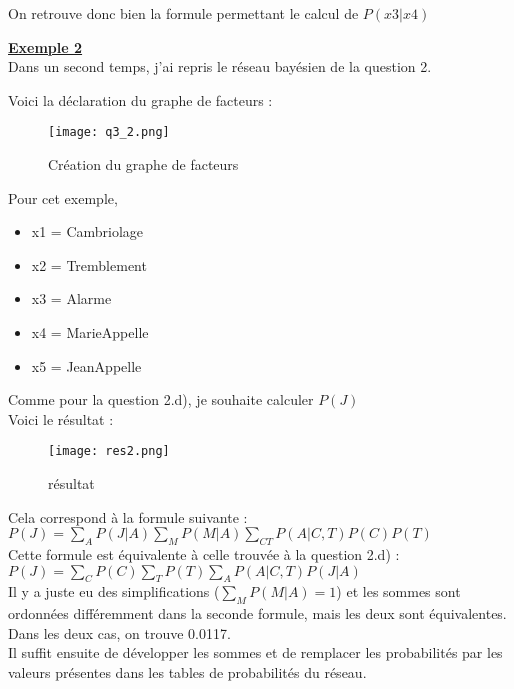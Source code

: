 \documentclass[12pt]{article}
\begin{document}
On retrouve donc bien la formule permettant le calcul de $P(x3|x4)$

\textbf{\underline{Exemple 2}}
\\
Dans un second temps, j'ai repris le réseau bayésien de la question 2.

Voici la déclaration du graphe de facteurs :
\\
\begin{figure}[H]
\begin{center}
  \texttt{[image: q3\_2.png]}
  \caption{Création du graphe de facteurs}
  \label{fig:Exemple}
\end{center}
\end{figure}

Pour cet exemple, 
\begin{itemize}
\item x1 = Cambriolage
\item x2 = Tremblement
\item x3 = Alarme
\item x4 = MarieAppelle
\item x5 = JeanAppelle
\end{itemize}
Comme pour la question 2.d), je souhaite calculer $P(J)$ \\
Voici le résultat : 
\begin{figure}[H]
\begin{center}
  \texttt{[image: res2.png]}
  \caption{résultat}
\end{center}
\end{figure}
Cela correspond à la formule suivante : \\ 
$P(J) = \sum_{A} P(J|A) \sum_{M} P(M|A) \sum_{C T} P(A|C, T) P(C) P(T) $ \\
Cette formule est équivalente à celle trouvée à la question 2.d) : \\
$P(J) = \sum_{C} P(C) \sum_{T} P(T) \sum_{A} P(A|C,T)P(J|A)$
\\ \linebreak
Il y a juste eu des simplifications ($\sum_{M} P(M|A) = 1$) et les sommes sont ordonnées différemment dans la seconde formule, mais les deux sont équivalentes.  Dans les deux cas, on trouve 0.0117.\\ 
Il suffit ensuite de développer les sommes et de remplacer les probabilités par les valeurs présentes dans les tables de probabilités du réseau.
\end{document}
